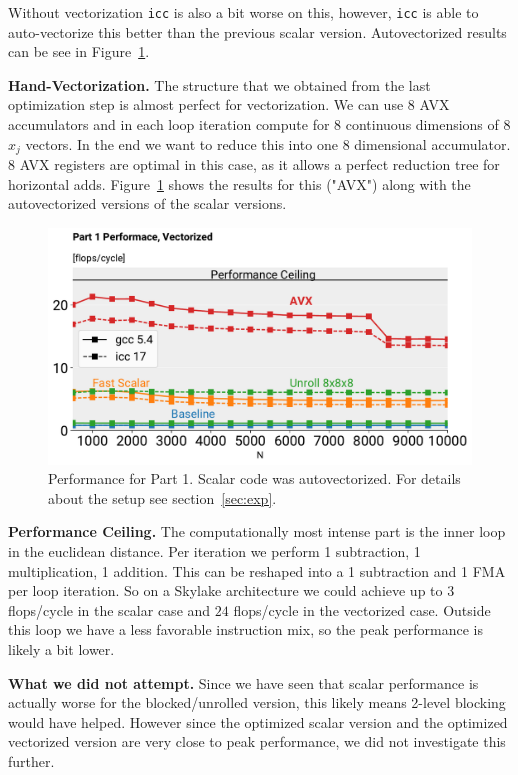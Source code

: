 \documentclass[letterpaper]{article}
\newcommand{\mypar}[1]{{\bf #1.}}
\begin{document}
Without vectorization \texttt{icc} is also a bit worse on this, however, \texttt{icc} is able to auto-vectorize this better than the previous scalar version. Autovectorized results can be see in Figure~\ref{fig:part1:vec}.

\mypar{Hand-Vectorization}
The structure that we obtained from the last optimization step is almost perfect for vectorization. We can use 8 AVX accumulators and in each loop iteration compute for 8 continuous dimensions of 8 $x_j$ vectors. In the end we want to reduce this into one 8 dimensional accumulator. 8 AVX registers are optimal in this case, as it allows a perfect reduction tree for horizontal adds. Figure~\ref{fig:part1:vec} shows the results for this ("AVX") along with the autovectorized versions of the scalar versions.

\begin{figure}[h]
  \includegraphics[width=\linewidth]{images/part1_vec}
  \caption{Performance for Part 1. Scalar code was autovectorized. For details about the setup see section~\ref{sec:exp}.}
   \label{fig:part1:vec}
   \vspace{-3mm}
\end{figure}

\mypar{Performance Ceiling}
The computationally most intense part is the inner loop in the euclidean distance. Per iteration we perform 1 subtraction, 1 multiplication, 1 addition. This can be reshaped into a 1 subtraction and 1 FMA per loop iteration. So on a Skylake architecture we could achieve up to $3$ flops/cycle in the scalar case and $24$ flops/cycle in the vectorized case. Outside this loop we have a less favorable instruction mix, so the peak performance is likely a bit lower.

\mypar{What we did not attempt} Since we have seen that scalar performance is actually worse for the blocked/unrolled version, this likely means 2-level blocking would have helped. However since the optimized scalar version and the optimized vectorized version are very close to peak performance, we did not investigate this further.
\end{document}
